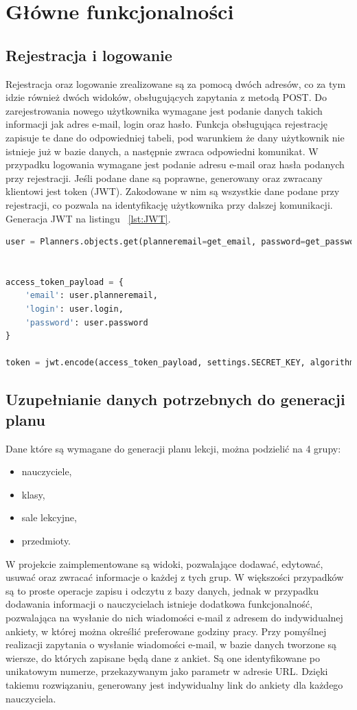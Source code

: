 \section{Główne funkcjonalności}
\subsection{Rejestracja i logowanie}
Rejestracja oraz logowanie zrealizowane są za pomocą dwóch adresów, co za tym idzie również dwóch widoków, obsługujących zapytania z metodą POST. Do zarejestrowania nowego użytkownika wymagane jest podanie danych takich informacji jak adres e-mail, login oraz hasło. Funkcja obsługująca rejestrację zapisuje te dane do odpowiedniej tabeli, pod warunkiem że dany użytkownik nie istnieje już w bazie danych, a następnie zwraca odpowiedni komunikat. W przypadku logowania wymagane jest podanie adresu e-mail oraz hasła podanych przy rejestracji. Jeśli podane dane są poprawne, generowany oraz zwracany klientowi jest token (JWT). Zakodowane w nim są wszystkie dane podane przy rejestracji, co pozwala na identyfikację użytkownika przy dalszej komunikacji. Generacja JWT na listingu ~\ref{lst:JWT}. 

\begin{lstlisting}[language=Python, caption=Widok obsługujący zapytanie typu POST, label={lst:JWT}]
user = Planners.objects.get(planneremail=get_email, password=get_password)


access_token_payload = {
	'email': user.planneremail,
	'login': user.login,
	'password': user.password
}

token = jwt.encode(access_token_payload, settings.SECRET_KEY, algorithm='HS256').decode('utf-8')
\end{lstlisting}

\subsection{Uzupełnianie danych potrzebnych do generacji planu}
Dane które są wymagane do generacji planu lekcji, można podzielić na 4 grupy:
\begin{itemize}
	\item nauczyciele,
	\item klasy,
	\item sale lekcyjne,
	\item przedmioty.
\end{itemize}

W projekcie zaimplementowane są widoki, pozwalające dodawać, edytować, usuwać oraz zwracać informacje o każdej z tych grup. W większości przypadków są to proste operacje zapisu i odczytu z bazy danych, jednak w przypadku dodawania informacji o nauczycielach istnieje dodatkowa funkcjonalność, pozwalająca na wysłanie do nich wiadomości e-mail z adresem do indywidualnej ankiety, w której można określić preferowane godziny pracy. Przy pomyślnej realizacji zapytania o wysłanie wiadomości e-mail, w bazie danych tworzone są wiersze, do których zapisane będą dane z ankiet. Są one identyfikowane po unikatowym numerze, przekazywanym jako parametr w adresie URL. Dzięki takiemu rozwiązaniu, generowany jest indywidualny link do ankiety dla każdego nauczyciela.
